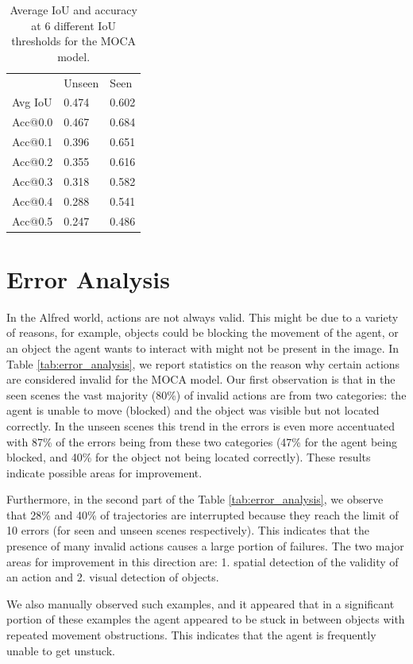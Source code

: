 \documentclass[11pt,a4paper]{article}
\begin{document}
\begin{table}[]
\centering
\begin{tabular}{lll}
        & Unseen & Seen  \\
Avg IoU & 0.474  & 0.602 \\
Acc@0.0 & 0.467  & 0.684 \\
Acc@0.1 & 0.396  & 0.651 \\
Acc@0.2 & 0.355  & 0.616 \\
Acc@0.3 & 0.318  & 0.582 \\
Acc@0.4 & 0.288  & 0.541 \\
Acc@0.5 & 0.247  & 0.486
\end{tabular}
\caption{Average IoU and accuracy at 6 different IoU thresholds for the MOCA model.}
\label{tab:seg_acc}
\end{table}



\section{Error Analysis}
In the Alfred world, actions are not always valid. This might be due to a variety of reasons, for example, objects could be blocking the movement of the agent, or an object the agent wants to interact with might not be present in the image.   
In Table \ref{tab:error_analysis}, we report statistics on the reason why certain actions are considered invalid for the MOCA model. Our first observation is that in the seen scenes  the vast majority (80\%) of invalid actions are from two categories: the agent is unable to move (blocked) and the object was visible but not located correctly. In the unseen scenes this trend in the errors is even more accentuated with   87\% of the errors being from these two categories  (47\% for the agent being blocked, and 40\% for the object not being located correctly). These results indicate possible areas for improvement.

Furthermore, in the second part of the Table \ref{tab:error_analysis}, we observe that 28\% and 40\% of trajectories are interrupted because they reach the limit of 10 errors (for seen and unseen scenes respectively). This indicates that the presence of many invalid actions causes a large portion of failures. The two major areas for improvement in this direction are: 1. spatial detection of the validity of an action and 2. visual detection of objects.

We also manually observed such examples, and it appeared that in a significant portion of these examples the agent appeared to be stuck in between objects with repeated movement obstructions. This indicates that the agent is frequently unable to get unstuck. 
\end{document}
